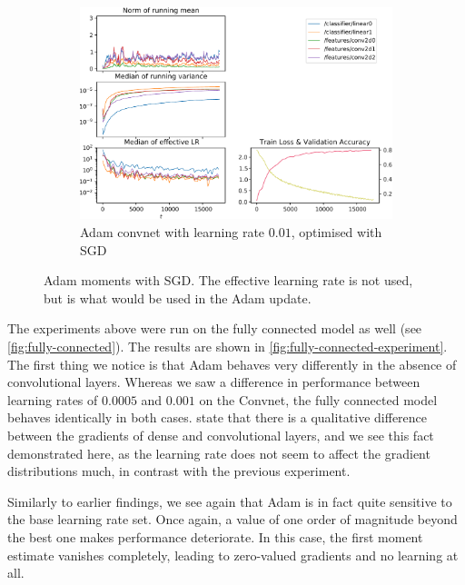 \begin{figure}
    \begin{subfigure}{\textwidth}
        \centering
        \includegraphics[width=\linewidth]{gfx/diagrams/experiments/adam/adammodel_sgd_001_0_-1.pdf}
        \caption{Adam convnet with learning rate $0.01$, optimised with SGD}
        \label{fig:adammodel-3}
    \end{subfigure}
    \label{fig:adammodel-sgd}
    \caption[Adam moments with SGD]{Adam moments with SGD. The effective learning rate is not used, but
    is what would be used in the Adam update.}
\end{figure}

The experiments above were run on the fully connected model as well (see
\cref{fig:fully-connected}). The results are shown in
\cref{fig:fully-connected-experiment}. The first thing we notice is that Adam
behaves very differently in the absence of convolutional layers. Whereas we saw
a difference in performance between learning rates of $0.0005$ and $0.001$ on
the Convnet, the fully connected model behaves identically in both cases.
\citeauthor{kingma2014adam} state that there is a qualitative difference between
the gradients of dense and convolutional layers, and we see this fact
demonstrated here, as the learning rate does not seem to affect the gradient
distributions much, in contrast with the previous experiment.

Similarly to earlier findings, we see again that Adam is in fact quite sensitive
to the base learning rate set. Once again, a value of one order of magnitude
beyond the best one makes performance deteriorate. In this case, the first
moment estimate vanishes completely, leading to zero-valued gradients and no
learning at all.

